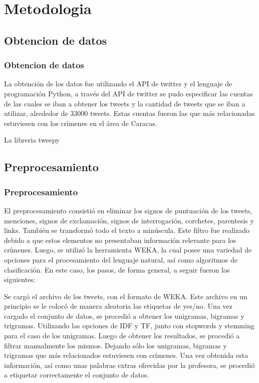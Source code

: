 \documentclass{beamer}
\begin{document}
\section{Metodologia}

\subsection{Obtencion de datos}
\begin{frame}
\frametitle{Obtencion de datos}
La obtención de los datos fue utilizando el API de twitter y el lenguaje de programación Python, a través del API de twitter se pudo especificar las cuentas de las cuales se iban a obtener los tweets y la cantidad de tweets que se iban a utilizar, alrededor de 33000 tweets. Estas cuentas fueron las que más relacionadas estuviesen con los crímenes en el área de Caracas.

\item La libreria tweepy
\end{frame}


\subsection{Preprocesamiento}
\begin{frame}
\frametitle{Preprocesamiento}
El preprocesamiento consistió en eliminar los signos de puntuación de los tweets, menciones, signos de exclamación, signos de interrogación, corchetes, parentesis y links. También se transformó todo el texto a minúscula. Este filtro fue realizado debido a que estos elementos no presentaban información relevante para los crímenes. Luego, se utilizó la herramienta WEKA, la cual posee una variedad de opciones para el procesamiento del lenguaje natural, así como algoritmos de clasificación. En este caso, los pasos, de forma general, a seguir fueron los siguientes:


Se cargó el archivo de los tweets, con el formato de WEKA. Este archivo en un principio se le colocó de manera aleatoria las etiquetas de yes/no.
Una vez cargado el conjunto de datos, se procedió a obtener los unigramas, bigramas y trigramas. Utilizando las opciones de IDF y TF, junto con stopwords y stemming para el caso de los unigramas.
Luego de obtener los resultados, se procedió a filtrar manualmente los mismos. Dejando sólo los unigramas, bigramas y trigramas que más relacionados estuviesen con crímenes.
Una vez obtenida esta información, así como unas palabras extras ofrecidas por la profesora, se procedió a etiquetar correctamente el conjunto de datos.
\end{frame}
\end{document}
